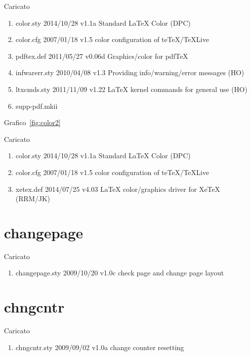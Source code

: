 Caricato 
\begin{enumerate}
\item color.sty 2014/10/28 v1.1a Standard LaTeX Color (DPC)
\item color.cfg 2007/01/18 v1.5 color configuration of teTeX/TeXLive
\item pdftex.def 2011/05/27 v0.06d Graphics/color for pdfTeX
\item infwarerr.sty 2010/04/08 v1.3 Providing info/warning/error messages (HO)
\item ltxcmds.sty 2011/11/09 v1.22 LaTeX kernel commands for general use (HO)
\item supp-pdf.mkii
\end{enumerate}

Grafico~\vref{fig:color2}

Caricato 
\begin{enumerate}
	 \item color.sty    2014/10/28 v1.1a Standard LaTeX Color (DPC)
	 \item color.cfg    2007/01/18 v1.5 color configuration of teTeX/TeXLive
	 \item xetex.def    2014/07/25 v4.03 LaTeX color/graphics driver for XeTeX (RRM/JK)
\end{enumerate}

\section{changepage}

Caricato 
\begin{enumerate}
\item changepage.sty 2009/10/20 v1.0c check page and change page layout
\end{enumerate}
\section{chngcntr}

Caricato 
\begin{enumerate}
\item chngcntr.sty 2009/09/02 v1.0a change counter resetting
\end{enumerate}
